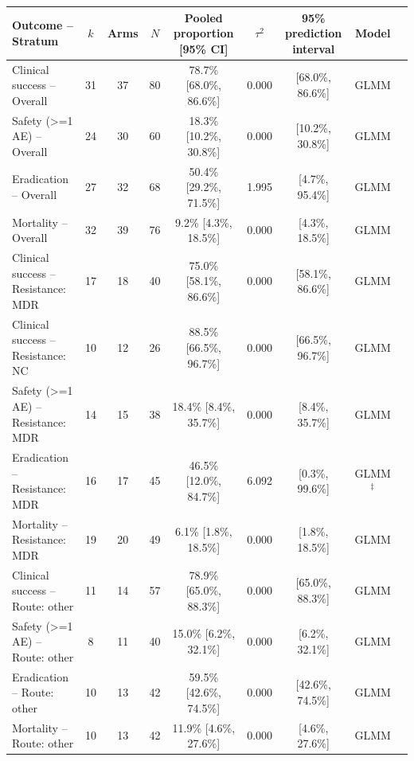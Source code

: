 \begin{tabular}{lcccccccc}
\toprule
Outcome -- Stratum & $k$ & Arms & $N$ & Pooled proportion [95\% CI] & $\tau^2$ & 95\% prediction interval & Model \\
\midrule
Clinical success -- Overall & 31 & 37 & 80 & 78.7\% [68.0\%, 86.6\%] & 0.000 & [68.0\%, 86.6\%] & GLMM \\
Safety (>=1 AE) -- Overall & 24 & 30 & 60 & 18.3\% [10.2\%, 30.8\%] & 0.000 & [10.2\%, 30.8\%] & GLMM \\
Eradication -- Overall & 27 & 32 & 68 & 50.4\% [29.2\%, 71.5\%] & 1.995 & [4.7\%, 95.4\%] & GLMM \\
Mortality -- Overall & 32 & 39 & 76 & 9.2\% [4.3\%, 18.5\%] & 0.000 & [4.3\%, 18.5\%] & GLMM \\
Clinical success -- Resistance: MDR & 17 & 18 & 40 & 75.0\% [58.1\%, 86.6\%] & 0.000 & [58.1\%, 86.6\%] & GLMM \\
Clinical success -- Resistance: NC & 10 & 12 & 26 & 88.5\% [66.5\%, 96.7\%] & 0.000 & [66.5\%, 96.7\%] & GLMM \\
Safety (>=1 AE) -- Resistance: MDR & 14 & 15 & 38 & 18.4\% [8.4\%, 35.7\%] & 0.000 & [8.4\%, 35.7\%] & GLMM \\
Eradication -- Resistance: MDR & 16 & 17 & 45 & 46.5\% [12.0\%, 84.7\%] & 6.092 & [0.3\%, 99.6\%] & GLMM$^\ddagger$ \\
Mortality -- Resistance: MDR & 19 & 20 & 49 & 6.1\% [1.8\%, 18.5\%] & 0.000 & [1.8\%, 18.5\%] & GLMM \\
Clinical success -- Route: other & 11 & 14 & 57 & 78.9\% [65.0\%, 88.3\%] & 0.000 & [65.0\%, 88.3\%] & GLMM \\
Safety (>=1 AE) -- Route: other & 8 & 11 & 40 & 15.0\% [6.2\%, 32.1\%] & 0.000 & [6.2\%, 32.1\%] & GLMM \\
Eradication -- Route: other & 10 & 13 & 42 & 59.5\% [42.6\%, 74.5\%] & 0.000 & [42.6\%, 74.5\%] & GLMM \\
Mortality -- Route: other & 10 & 13 & 42 & 11.9\% [4.6\%, 27.6\%] & 0.000 & [4.6\%, 27.6\%] & GLMM \\
\bottomrule
\end{tabular}
